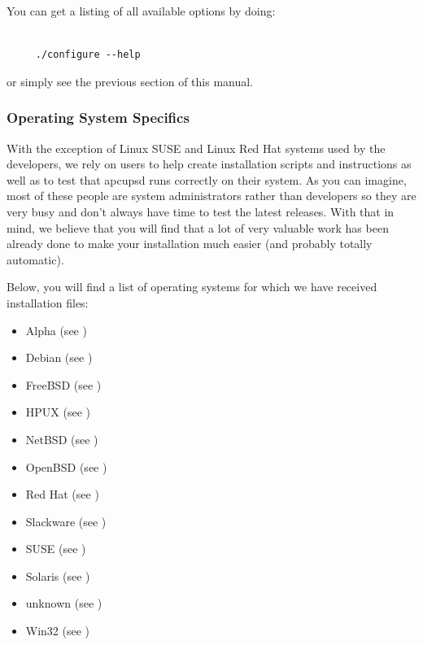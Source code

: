 You can get a listing of all available options by doing: 

\footnotesize
\begin{verbatim}
     
     ./configure --help
\end{verbatim}
\normalsize

or simply see the previous section of this manual. 

\label{Operating-System-Specifics}

\subsubsection*{Operating System Specifics}

\label{index-OSes-31}
With the exception of Linux SUSE and Linux Red Hat systems used by the
developers, we rely on users to help create installation scripts and
instructions as well as to test that apcupsd runs correctly on their system.
As you can imagine, most of these people are system administrators rather than
developers so they are very busy and don't always have time to test the latest
releases.  With that in mind, we believe that you will find that a lot of very
valuable work has been already done to make your installation much easier (and
probably totally automatic).  

Below, you will find a list of operating systems for which we have received
installation files:  

\begin{itemize}
\item Alpha (see 
)  
\item Debian (see 
)  
\item FreeBSD (see 
)  
\item HPUX (see 
)  
\item NetBSD (see 
)  
\item OpenBSD (see 
)  
\item Red Hat (see 
)  
\item Slackware (see 
)  
\item SUSE (see 
)  
\item Solaris (see 
)  
\item unknown (see 
)  
\item Win32 (see 
) 
\end{itemize}

